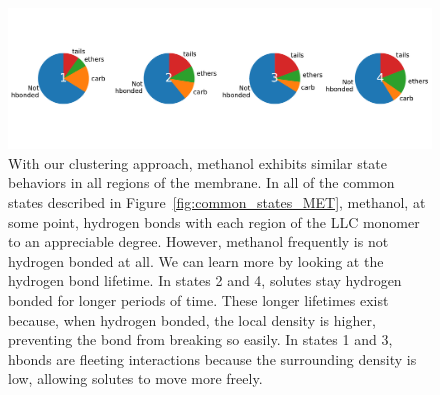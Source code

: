 \documentclass{article}
\begin{document}
  \begin{figure}
  \centering
  \includegraphics[width=\textwidth]{hbond_pi_charts.pdf}
  \caption{With our clustering approach, methanol exhibits similar state behaviors
  in all regions of the membrane. In all of the common states described in 
  Figure~\ref{fig:common_states_MET}, methanol, at some point, hydrogen bonds with 
  each region of the LLC monomer to an appreciable degree. However, methanol frequently
  is not hydrogen bonded at all.
  We can learn more by looking at the hydrogen bond lifetime. In states 2 and 4, solutes
  stay hydrogen bonded for longer periods of time.
  These longer lifetimes exist because, when hydrogen bonded, the local density is higher, preventing the 
  bond from breaking so easily. In states 1 and 3, hbonds are fleeting interactions because
  the surrounding density is low, allowing solutes to move more freely.
  }\label{fig:hbond_pichart}
  \end{figure}
    
\end{document}
